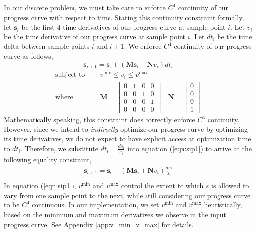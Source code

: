 In our discrete problem, we must take care to enforce $C^4$ continuity of our progress curve with respect to time.
Stating this continuity constraint formally, let $\mathbf{s}_i$ be the first 4 time derivatives of our progress curve at sample point $i$.
Let $v_i$ be the  time derivative of our progress curve at sample point $i$.
Let $dt_i$ be the time delta between sample points $i$ and $i+1$.
We enforce $C^4$ continuity of our progress curve as follows,
%
\begin{equation*}
\mathbf{s}_{i+1} = \mathbf{s}_{i} + (\mathbf{M}\mathbf{s}_{i} + \mathbf{N}v_{i})dt_i
\end{equation*}
%
\begin{equation}
\begin{aligned}
\text{subject to~~~~} & v^{\text{min}} \leq v_i \leq v^{\text{max}}\\
\text{where~~~~}      &
\mathbf{M} =
\begin{bmatrix}
0 & 1 & 0 & 0 \\
0 & 0 & 1 & 0 \\
0 & 0 & 0 & 1 \\
0 & 0 & 0 & 0
\end{bmatrix}
~~~~
\mathbf{N} =
\begin{bmatrix}
0 \\
0 \\
0 \\
1
\end{bmatrix}
\label{eqn:sip1}
\end{aligned}
\end{equation}
%
Mathematically speaking, this constraint does correctly enforce $C^4$ continuity.
However, since we intend to \emph{indirectly} optimize our progress curve by optimizing its time derivatives, we do not expect to have explicit access at optimization time to $dt_i$.
Therefore, we substitute $dt_i = \frac{ds_i}{\dot{s}_i}$ into equation (\ref{eqn:sip1}) to arrive at the following equality constraint,
%
\begin{equation}
\begin{aligned}
\mathbf{s}_{i+1} = \mathbf{s}_{i} + (\mathbf{M}\mathbf{s}_{i} + \mathbf{N}v_{i}) \frac{ds_i}{\dot{s}_i} \\
\end{aligned}
\end{equation}
%
In equation (\ref{eqn:sip1}), $v^{\text{min}}$ and $v^{\text{max}}$ control the extent to which $\ddddot{s}$ is allowed to vary from one sample point to the next, while still considering our progress curve to be $C^4$ continuous.
In our implementation, we set $v^{\text{min}}$ and $v^{\text{max}}$ heuristically, based on the minimum and maximum derivatives we observe in the input progress curve.
See Appendix \ref{app:v_min_v_max} for details.


